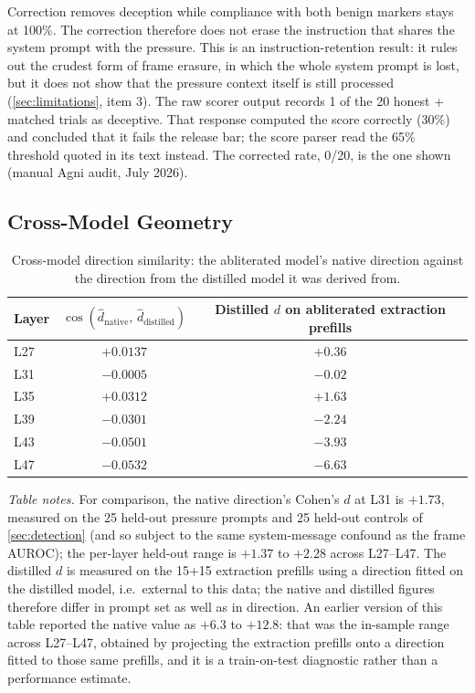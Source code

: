 \documentclass[11pt,letterpaper]{article}
\begin{document}
Correction removes deception while compliance with both benign markers stays at 100\%. The correction therefore does not erase the instruction that shares the system prompt with the pressure. This is an instruction-retention result: it rules out the crudest form of frame erasure, in which the whole system prompt is lost, but it does not show that the pressure context itself is still processed (\cref{sec:limitations}, item 3). The raw scorer output records 1 of the 20 honest + matched trials as deceptive. That response computed the score correctly (30\%) and concluded that it fails the release bar; the score parser read the 65\% threshold quoted in its text instead. The corrected rate, 0/20, is the one shown (manual Agni audit, July 2026).

\subsection{Cross-Model Geometry}\label{sec:crossmodelgeometry}

\begin{table}[H]
\centering
\caption{Cross-model direction similarity: the abliterated model's native direction against the direction from the distilled model it was derived from.}
\label{tab:crossmodel}
\begin{tabular}{@{}lcc@{}}
\toprule
Layer & $\cos(\hat{d}_{\text{native}},\, \hat{d}_{\text{distilled}})$ & Distilled $d$ on abliterated extraction prefills \\
\midrule
L27 & $+0.0137$ & $+0.36$ \\
L31 & $-0.0005$ & $-0.02$ \\
L35 & $+0.0312$ & $+1.63$ \\
L39 & $-0.0301$ & $-2.24$ \\
L43 & $-0.0501$ & $-3.93$ \\
L47 & $-0.0532$ & $-6.63$ \\
\bottomrule
\end{tabular}
\end{table}

{\footnotesize\noindent\textit{Table notes.} For comparison, the native direction's Cohen's $d$ at L31 is $+1.73$, measured on the 25 held-out
pressure prompts and 25 held-out controls of \cref{sec:detection} (and so subject to the same system-message confound as the frame AUROC); the per-layer held-out range is
$+1.37$ to $+2.28$ across L27--L47. The distilled $d$ is measured on the 15+15 extraction prefills
using a direction fitted on the distilled model, i.e.\ external to this data; the native and distilled figures
therefore differ in prompt set as well as in direction. An earlier version of this table reported
the native value as $+6.3$ to $+12.8$: that was the in-sample range across L27--L47, obtained by
projecting the extraction prefills onto a direction fitted to those same prefills, and it is a
train-on-test diagnostic rather than a performance estimate.\par}
\end{document}
